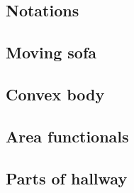 
\subsection{Notations}
\label{sec:notations}


\subsection{Moving sofa}
\label{sec:moving-sofa}


\subsection{Convex body}
\label{sec:convex-body}


\subsection{Area functionals}
\label{sec:area-functionals}


\subsection{Parts of hallway}
\label{sec:parts-of-hallway}


